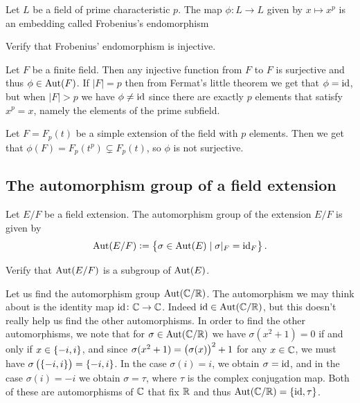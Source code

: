 \documentclass[11pt,a4paper]{article}
\begin{document}
\begin{definition}
  Let $L$ be a field of prime characteristic $p$.
  The map $\phi \colon L \to L$ given by $x \mapsto x^p$
  is an embedding called Frobenius's endomorphism
\end{definition}

\begin{exercise}
  Verify that Frobenius' endomorphism is injective.
\end{exercise}

\begin{example}
  Let $F$ be a finite field.
  Then any injective function from $F$ to $F$ is surjective
  and thus $\phi \in \operatorname{Aut}(F)$.
  If $|F| = p$ then from Fermat's little theorem we get that $\phi = \operatorname{id}$,
  but when $|F| > p$ we have $\phi \neq \operatorname{id}$ since there are exactly $p$
  elements that satisfy $x^p = x$, namely the elements of the prime subfield.
\end{example}

\begin{example}
  Let $F = F_p(t)$ be a simple extension of the field with $p$ elements.
  Then we get that $\phi(F) = F_p(t^p) \subsetneq F_p(t)$,
  so $\phi$ is not surjective.
\end{example}

\subsection{The automorphism group of a field extension}

\begin{definition}
  Let $E/F$ be a field extension.
  The automorphism group of the extension $E/F$
  is given by
  \[
    \operatorname{Aut}(E/F) := \left\{\sigma \in \operatorname{Aut}(E) \mid \sigma\vert_{F} = \operatorname{id}_{F}\right\}.
  \]
\end{definition}

\begin{exercise}
  Verify that $\operatorname{Aut}(E/F)$ is a subgroup of $\operatorname{Aut}(E)$.
\end{exercise}

\begin{example}
  Let us find the automorphism group $\operatorname{Aut}(\mathbb{C}/\mathbb{R})$.
  The automorphism we may think about is
  the identity map $\operatorname{id} \colon \mathbb{C} \to \mathbb{C}$.
  Indeed $\operatorname{id} \in \operatorname{Aut}(\mathbb{C}/\mathbb{R})$, but this doesn't really help us find
  the other automorphisms.
  In order to find the other automorphisms,
  we note that for $\sigma \in \operatorname{Aut}(\mathbb{C}/\mathbb{R})$
  we have $\sigma(x^2 + 1) = 0$
  if and only if $x \in \left\{-i,i\right\}$,
  and since $\sigma(x^2 + 1) = \del{\sigma(x)}^2 + 1$ for any $x \in \mathbb{C}$,
  we must have $\sigma\del{\set{-i,i}} = \set{-i,i}$.
  In the case $\sigma(i) = i$,
  we obtain $\sigma = \operatorname{id}$,
  and in the case $\sigma(i) = -i$
  we obtain $\sigma = \tau$,
  where $\tau$ is the complex conjugation map.
  Both of these are automorphisms of $\mathbb{C}$ that fix $\mathbb{R}$
  and thus $\operatorname{Aut}(\mathbb{C}/\mathbb{R}) = \left\{\operatorname{id},\tau\right\}$.
\end{example}
\end{document}

